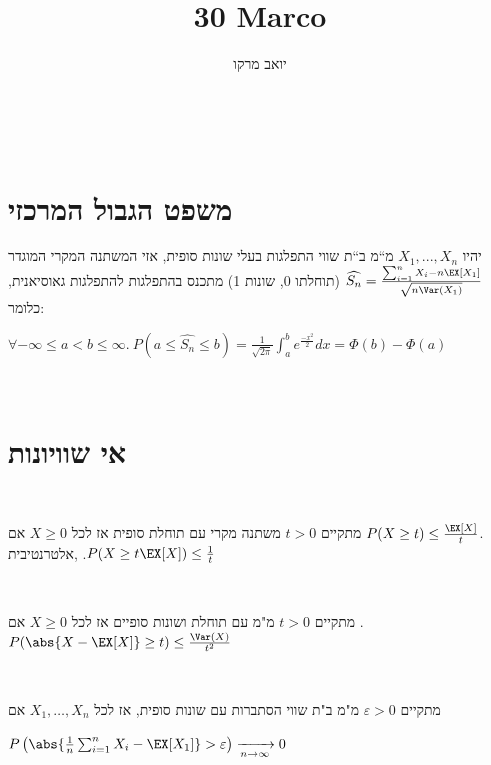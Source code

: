 \documentclass[8pt,twocolumn]{extarticle}
\title{30 Marco}
\author{יואב מרקו}
\begin{document}
‏\section{משפט הגבול המרכזי}
יהיו $X_{1},...,X_{n}$ מ“מ ב“ת שווי התפלגות בעלי שונות
סופית, אזי המשתנה המקרי המוגדר $\widehat{S_{n}}=\frac{\sum_{i=1}^{n}X_{i}-n\EX\left[X_{1}\right]}{\sqrt{n\Var\left(X_{1}\right)}}$
(תוחלתו 0, שונות 1) מתכנס בהתפלגות להתפלגות גאוסיאנית, כלומר:

\hspace*{\fill}
\(\displaystyle
\forall -\infty\leq a<b\leq\infty.\
P\left(a\leq\widehat{S_{n}}\leq b\right)=\frac{1}{\sqrt{2\pi}}\int_{a}^{b}e^{\frac{-x^{2}}{2}}dx=\varPhi\left(b\right)-\varPhi\left(a\right)\)

‏\section{אי שוויונות} ‏\begin{claim}[א"ש מרקוב]
  אם ‎\(X\geq 0\) משתנה מקרי עם תוחלת סופית אז לכל ‎\(t>0\) מתקיים
  ‎\(P(X\geq t) \leq  \frac{\EX[X]}{t}\).
  אלטרנטיבית, .‎\(P(X \geq t \EX[X]) \leq \frac{1}{t}\) ‏\end{claim}
‏\begin{claim}[א"ש צ'בישב] אם ‎\(X\geq 0\) מ"מ עם תוחלת ושונות סופיים
  אז לכל ‎\(t>0\) מתקיים .‎\( P(\abs{X - \EX[X]} \geq t) \leq \frac{\Var(X)}{t^2} \)
  ‏\end{claim}
‏\begin{theorem}
אם ‎\(X_1, \dots ,X_n\) מ"מ ב"ת שווי הסתברות עם שונות סופית, אז לכל ‎\(\varepsilon >0\) מתקיים

\hspace*{\fill}
‎\( P\left(\abs{\frac{1}{n} \sum_{i=1}^n X_i - \EX[X_1]} > \varepsilon\right)\xrightarrow[n\rightarrow\infty]{} 0 \)
\hspace*{\fill}
‏\end{theorem}
\end{document}
